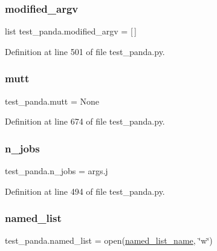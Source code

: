 \subsubsection{\texorpdfstring{modified\+\_\+argv}{modified\_argv}}
{\footnotesize\ttfamily list test\+\_\+panda.\+modified\+\_\+argv = \mbox{[}$\,$\mbox{]}}



Definition at line 501 of file test\+\_\+panda.\+py.

\mbox{\label{namespacetest__panda_a50a12673670ef760b925f1685e7dab23}} 
\subsubsection{\texorpdfstring{mutt}{mutt}}
{\footnotesize\ttfamily test\+\_\+panda.\+mutt = None}



Definition at line 674 of file test\+\_\+panda.\+py.

\mbox{\label{namespacetest__panda_aa5fd25c613bf73eb86bd917d77eaa028}} 
\subsubsection{\texorpdfstring{n\+\_\+jobs}{n\_jobs}}
{\footnotesize\ttfamily test\+\_\+panda.\+n\+\_\+jobs = args.\+j}



Definition at line 494 of file test\+\_\+panda.\+py.

\mbox{\label{namespacetest__panda_a2989f96cdaa7a4aef74fb9e12de11b07}} 
\subsubsection{\texorpdfstring{named\+\_\+list}{named\_list}}
{\footnotesize\ttfamily test\+\_\+panda.\+named\+\_\+list = open(\hyperlink{namespacetest__panda_a55a11ca1425cca9bf61f5e1047db06a0}{named\+\_\+list\+\_\+name}, \char`\"{}w\char`\"{})}



